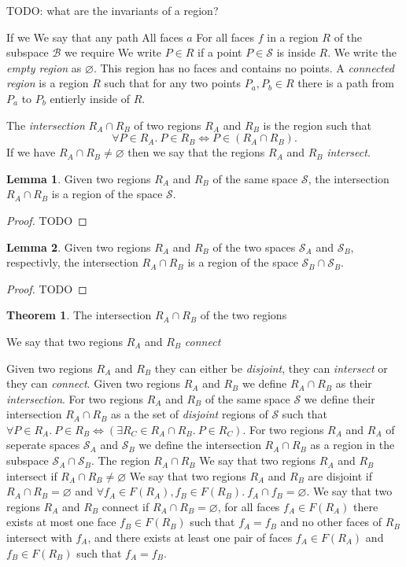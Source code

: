 \documentclass[a4paper]{article}
\theoremstyle{definition}
\newtheorem{lemma}{Lemma}[section]
\newtheorem{theorem}{Theorem}[section]
\begin{document}
TODO: what are the invariants of a region?

If we 
We say that any path 
All faces $a$
For all faces $f$ in a region $R$ of the subspace $\mathcal{B}$ we require 
We write $P \in R$ if a point $P \in \mathcal{S}$ is inside $R$.
We write the \emph{empty region} as $\varnothing$. This region has no faces and contains no points.
A \emph{connected region} is a region $R$ such that for any two points $P_a, P_b \in R$ there is a path from $P_a$ to $P_b$ entierly inside of $R$.

The \emph{intersection} $R_A \cap R_B$ of two regions $R_A$ and $R_B$ is the region such that
$$\forall P \in R_A.\ P \in R_B \iff P \in (R_A \cap R_B).$$
If we have $R_A \cap R_B \ne \varnothing$ then we say that the regions $R_A$ and $R_B$ \emph{intersect}.

\begin{lemma}
    Given two regions $R_A$ and $R_B$ of the same space $\mathcal{S}$, 
    the intersection $R_A \cap R_B$ is a region of the space $\mathcal{S}$.
\end{lemma}
\begin{proof}
    TODO
\end{proof}

\begin{lemma}
    Given two regions $R_A$ and $R_B$ of the two spaces $\mathcal{S}_A$ and $\mathcal{S}_B$, respectivly, 
    the intersection $R_A \cap R_B$ is a region of the space $\mathcal{S}_B \cap \mathcal{S}_B$.
\end{lemma}
\begin{proof}
    TODO
\end{proof}

\begin{theorem}
    The intersection $R_A \cap R_B$ of the two regions 
\end{theorem}

We say that two regions $R_A$ and $R_B$ \emph{connect}

Given two regions $R_A$ and $R_B$ they can either be \emph{disjoint}, they can \emph{intersect} or they can \emph{connect}.
Given two regions $R_A$ and $R_B$ we define $R_A \cap R_B$ as their \emph{intersection}.
For two regions $R_A$ and $R_B$ of the same space $\mathcal{S}$ we define their intersection $R_A \cap R_B$ as a the set of \emph{disjoint} regions of $\mathcal{S}$ such that $\forall P \in R_A.\ P \in R_B \iff \left(\exists R_C \in R_A \cap R_B.\ P \in R_C\right)$.
For two regions $R_A$ and $R_A$ of seperate spaces $\mathcal{S}_A$ and $\mathcal{S}_B$ we define the intersection $R_A \cap R_B$ as a region in the subspace $\mathcal{S}_A \cap \mathcal{S}_B$.
The region $R_A \cap R_B$
We say that two regions $R_A$ and $R_B$ intersect if $R_A \cap R_B \ne \varnothing$
We say that two regions $R_A$ and $R_B$ are disjoint if $R_A \cap R_B = \varnothing$ and $\forall f_A \in F(R_A), f_B \in F(R_B).\ f_A \cap f_B = \varnothing$.
We say that two regions $R_A$ and $R_B$ connect if $R_A \cap R_B = \varnothing$, for all faces $f_A \in F(R_A)$ there exists at most one face $f_B \in F(R_B)$ such that $f_A = f_B$ and no other faces of $R_B$ intersect with $f_A$, and there exists at least one pair of faces $f_A \in F(R_A)$ and $f_B \in F(R_B)$ such that $f_A = f_B$.
\end{document}
